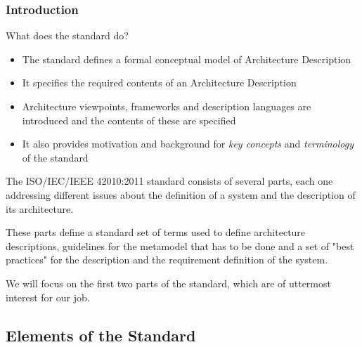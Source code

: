 		\begin{frame}
		\frametitle{Introduction}	
			\begin{block}{What does the standard do?}
			\vspace{0.3cm}
				\begin{itemize}\vspace{0.3cm}
					\item The standard defines a formal conceptual model of Architecture Description\vspace{0.3cm}
					\item It specifies the required contents of an Architecture Description\vspace{0.3cm}
					\item Architecture viewpoints, frameworks and description languages are introduced and the contents of these are specified\vspace{0.3cm}
					\item It also provides motivation and background for \emph{key concepts} and \emph{terminology} of the standard\vspace{0.3cm}
				\end{itemize}			
			\end{block}
		\end{frame}
		
		\begin{frame}
		\vspace{0.3cm}
			The ISO/IEC/IEEE 42010:2011 standard consists of several parts, each one addressing different issues about the definition of a system and the description of its architecture.
			\newline\newline
			
			These parts define a standard set of terms used to define architecture descriptions, guidelines for the metamodel that has to be done and a set of "best practices" for the description and the requirement definition of the system.
			\newline\newline
			
		We will focus on the first two parts of the standard, which are of uttermost interest for our job.
		
		\end{frame}
		
		\subsection{Elements of the Standard}
		
